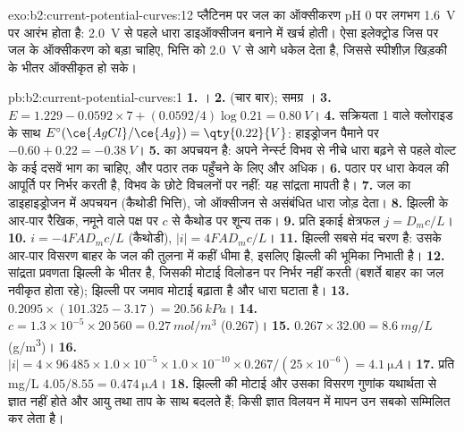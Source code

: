 \begin{solution}{exo:b2:current-potential-curves:12}
प्लैटिनम पर जल का ऑक्सीकरण pH 0 पर लगभग \qty{1.6}{V} पर आरंभ होता है:
\qty{2.0}{V} से पहले धारा डाइऑक्सीजन बनाने में खर्च होती। ऐसा इलेक्ट्रोड जिस पर
जल के ऑक्सीकरण को बड़ा  चाहिए, भित्ति को
\qty{2.0}{V} से आगे धकेल देता है, जिससे स्पीशीज़ खिड़की के भीतर ऑक्सीकृत हो सके।
\end{solution}

\begin{solution}{pb:b2:current-potential-curves:1}
\textbf{1.} ।
\textbf{2.}  (चार बार); समग्र ।
\textbf{3.} $E = 1.229 - 0.0592 \times 7 + (0.0592/4)\log 0.21 = \qty{0.80}{V}$।
\textbf{4.} सक्रियता 1 वाले क्लोराइड के साथ $E^\circ(\ce{AgCl}/\ce{Ag}) = \qty{0.22}{V}$:
हाइड्रोजन पैमाने पर $-0.60 + 0.22 = \qty{-0.38}{V}$।
\textbf{5.}  का अपचयन  है: अपने नेर्न्स्ट विभव से नीचे
धारा बढ़ने से पहले वोल्ट के कई दसवें भाग का  चाहिए,
और पठार तक पहुँचने के लिए और अधिक।
\textbf{6.} पठार पर धारा केवल  की आपूर्ति पर निर्भर करती है,
विभव के छोटे विचलनों पर नहीं: यह सांद्रता मापती है।
\textbf{7.} जल का डाइहाइड्रोजन में अपचयन (कैथोडी भित्ति), जो
ऑक्सीजन से असंबंधित धारा जोड़ देता।
\textbf{8.} झिल्ली के आर-पार रैखिक, नमूने वाले पक्ष पर $c$ से कैथोड पर
शून्य तक।
\textbf{9.} प्रति इकाई क्षेत्रफल $j = D_m c/L$।
\textbf{10.} $i = -4FAD_m c/L$ (कैथोडी), $|i| = 4FAD_mc/L$।
\textbf{11.} झिल्ली सबसे मंद चरण है: उसके आर-पार विसरण बाहर के जल की तुलना में
कहीं धीमा है, इसलिए झिल्ली  की भूमिका
निभाती है।
\textbf{12.} सांद्रता प्रवणता झिल्ली के भीतर है, जिसकी मोटाई
विलोडन पर निर्भर नहीं करती (बशर्ते बाहर का जल नवीकृत होता रहे);
झिल्ली पर जमाव मोटाई बढ़ाता है और धारा घटाता है।
\textbf{13.} $0.2095 \times (101.325 - 3.17) = \qty{20.56}{kPa}$।
\textbf{14.} $c = 1.3 \times 10^{-5} \times 20\,560 = \qty{0.27}{mol/m^3}$ ($0.267$)।
\textbf{15.} $0.267 \times 32.00 = \qty{8.6}{mg/L}$ (\unit{g/m^3})।
\textbf{16.} $|i| = 4 \times 96\,485 \times 1.0 \times 10^{-5} \times 1.0 \times 10^{-10}
\times 0.267/(25 \times 10^{-6}) = \qty{4.1}{\micro A}$।
\textbf{17.} प्रति \unit{mg/L} $4.05/8.55 = \qty{0.474}{\micro A}$।
\textbf{18.} झिल्ली की मोटाई और उसका विसरण गुणांक
यथार्थता से ज्ञात नहीं होते और आयु तथा ताप के साथ बदलते हैं; किसी ज्ञात
विलयन में मापन उन सबको सम्मिलित कर लेता है।

\end{solution}
